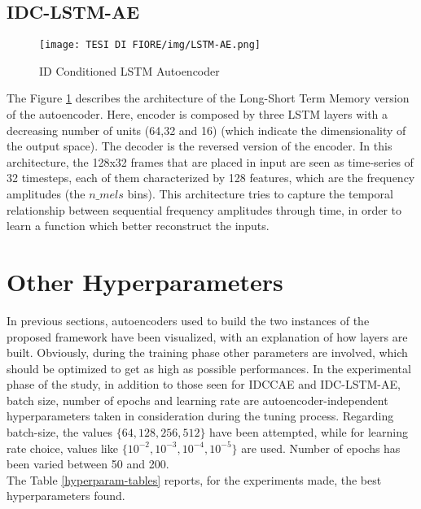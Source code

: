 \subsection{IDC-LSTM-AE}
\begin{figure}[ht]
\texttt{[image: TESI DI FIORE/img/LSTM-AE.png]}
\centering
\caption{ID Conditioned LSTM Autoencoder}
\label{LSTM-AE}
\end{figure}
The Figure \ref{LSTM-AE} describes the architecture of the Long-Short Term Memory version of the autoencoder. Here, encoder is composed by three LSTM layers with a decreasing number of units (64,32 and 16) (which indicate the dimensionality of the output space). The decoder is the reversed version of the encoder. In this architecture, the 128x32 frames that are placed in input are seen as time-series of 32 timesteps, each of them characterized by 128 features, which are the frequency amplitudes (the $n\_mels$ bins). This architecture tries to capture the temporal relationship between sequential frequency amplitudes through time, in order to learn a function which better reconstruct the inputs.

\section{Other Hyperparameters}
In previous sections, autoencoders used to build the two instances of the proposed framework have been visualized, with an explanation of how layers are built. Obviously, during the training phase other parameters are involved, which should be optimized to get as high as possible performances. In the experimental phase of the study, in addition to those seen for IDCCAE and IDC-LSTM-AE, batch size, number of epochs and learning rate are autoencoder-independent hyperparameters taken in consideration during the tuning process. Regarding batch-size, the values $\{64,128,256,512\}$ have been attempted, while for learning rate choice, values like $\{10^{-2}, 10^{-3}, 10^{-4}, 10^{-5}\}$ are used. Number of epochs has been varied between 50 and 200.\\
The Table \ref{hyperparam-tables} reports, for the experiments made, the best hyperparameters found.

